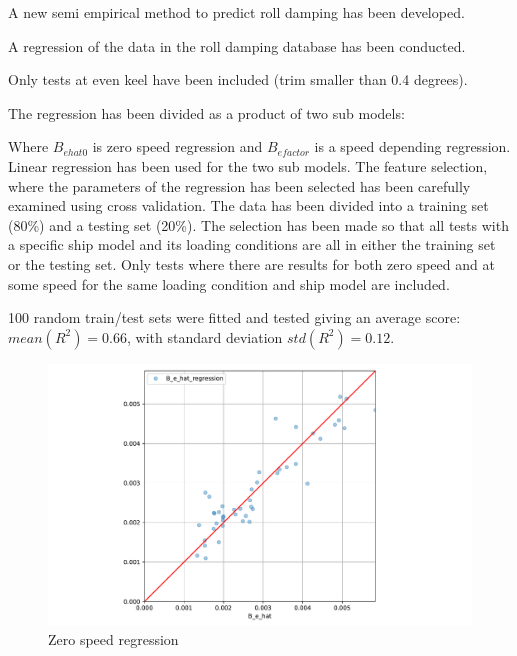 A new semi empirical method to predict roll damping has been developed. 

A regression of the data in the roll damping database has been conducted.

Only tests at even keel have been included (trim smaller than 0.4 degrees).

The regression has been divided as a product of two sub models:

Where $B_{ehat0}$ is zero speed regression and $B_{efactor}$ is a speed depending regression. Linear regression has been used for the two sub models. The feature selection, where the parameters of the regression has been selected has been carefully examined using cross validation. The data has been divided into a  training set (80\%) and a testing set (20\%). The selection has been made so that all tests with a specific ship model and its loading conditions are all in either the training set or the testing set. Only tests where there are results for both zero speed and at some speed for the same loading condition and ship model are included.    

100 random train/test sets were fitted and tested giving an average score: $mean(R^2)=0.66$, with standard deviation $std(R^2)=0.12$.

\begin{figure}[H]
    \centering
    \includegraphics[width=\columnwidth]{figures/B_e_hat0_regression.pdf}
    \caption{Zero speed regression}
    \label{fig:B_e_hat0_regression}
\end{figure}

